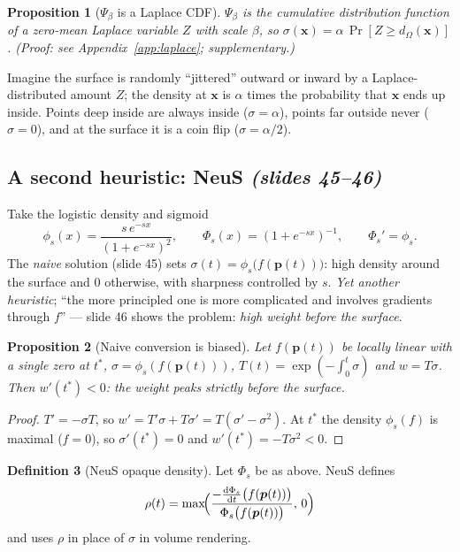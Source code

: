 \documentclass[11pt,a4paper]{article}
\newcommand{\bx}{\bm{x}}
\newcommand{\bp}{{\bm{p}}}
\theoremstyle{definition}
\newtheorem{definition}{Definition}[section]
\theoremstyle{plain}
\newtheorem{proposition}[definition]{Proposition}
\theoremstyle{remark}
\begin{document}
\begin{proposition}[$\Psi_\beta$ is a Laplace CDF]\label{prop:laplace}
$\Psi_\beta$ is the cumulative distribution function of a zero-mean Laplace variable $Z$ with scale $\beta$, so
$\sigma(\bx)=\alpha\,\Pr[Z\ge d_\Omega(\bx)]$. (Proof: see Appendix~\ref{app:laplace}; supplementary.)
\end{proposition}
\begin{intuition}
Imagine the surface is randomly ``jittered'' outward or inward by a Laplace-distributed amount $Z$; the density at $\bx$ is
$\alpha$ times the probability that $\bx$ ends up inside. Points deep inside are always inside ($\sigma=\alpha$),
points far outside never ($\sigma=0$), and at the surface it is a coin flip ($\sigma=\alpha/2$).
\end{intuition}

\subsection{A second heuristic: NeuS \emph{(slides 45--46)}}
Take the logistic density and sigmoid
\[
\phi_s(x)=\frac{s\,e^{-sx}}{(1+e^{-sx})^2},\qquad \Phi_s(x)=(1+e^{-sx})^{-1},\qquad \Phi_s'=\phi_s .
\]
The \emph{naive} solution (slide 45) sets $\sigma(t)=\phi_s\bigl(f(\bp(t))\bigr)$: high density around the surface and $0$
otherwise, with sharpness controlled by $s$. \emph{Yet another heuristic}; ``the more principled one is more complicated and
involves gradients through $f$'' --- slide 46 shows the problem: \emph{high weight before the surface}.

\begin{proposition}[Naive conversion is biased]\label{prop:naivebias}
Let $f(\bp(t))$ be locally linear with a single zero at $t^*$, $\sigma=\phi_s(f(\bp(t)))$, $T(t)=\exp(-\int_0^t\sigma)$ and
$w=T\sigma$. Then $w'(t^*)<0$: the weight peaks strictly \emph{before} the surface.
\end{proposition}
\begin{proof}
$T'=-\sigma T$, so $w'=T'\sigma+T\sigma'=T(\sigma'-\sigma^2)$. At $t^*$ the density $\phi_s(f)$ is maximal ($f=0$), so $\sigma'(t^*)=0$
and $w'(t^*)=-T\sigma^2<0$.
\end{proof}

\begin{definition}[NeuS opaque density]\label{def:neusrho}
Let $\Phi_s$ be as above. NeuS defines
\[
\rho(t)=\max\!\Bigl(\frac{-\frac{\mathrm d\Phi_s}{\mathrm dt}\bigl(f(\bp(t))\bigr)}{\Phi_s\bigl(f(\bp(t))\bigr)},\,0\Bigr)
\]
and uses $\rho$ in place of $\sigma$ in volume rendering.
\end{definition}
\end{document}
